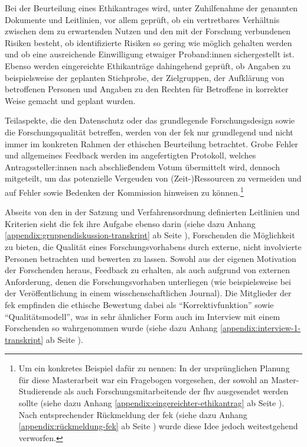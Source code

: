 \documentclass[a4paper,12pt,twoside]{scrreprt}
\begin{document}
Bei der Beurteilung eines Ethikantrages wird, unter Zuhilfenahme der genannten Dokumente und Leitlinien, vor allem geprüft, ob ein vertretbares Verhältnis zwischen dem zu erwartenden Nutzen und den mit der Forschung verbundenen Risiken besteht, ob identifizierte Risiken so gering wie möglich gehalten werden und ob eine ausreichende Einwilligung etwaiger Proband:innen sichergestellt ist. Ebenso werden eingereichte Ethikanträge dahingehend geprüft, ob Angaben zu beispielsweise der geplanten Stichprobe, der Zielgruppen, der Aufklärung von betroffenen Personen und Angaben zu den Rechten für Betroffene in korrekter Weise gemacht und geplant wurden. \cite[1\psq]{forschungsethik-kommission_der_fachhochschule_vorarlberg_verfahrensordnung_2020}

Teilaspekte, die den Datenschutz oder das grundlegende Forschungsdesign sowie die Forschungsqualität betreffen, werden von der \ac{fek} nur grundlegend und nicht immer im konkreten Rahmen der ethischen Beurteilung betrachtet. Grobe Fehler und allgemeines Feedback werden im angefertigten Protokoll, welches Antragssteller:innen nach abschließendem Votum übermittelt wird, dennoch mitgeteilt, um das potenzielle Vergeuden von (Zeit-)Ressourcen zu vermeiden und auf Fehler sowie Bedenken der Kommission hinweisen zu können.\footnote{Um ein konkretes Beispiel dafür zu nennen: In der ursprünglichen Planung für diese Masterarbeit war ein Fragebogen vorgesehen, der sowohl an Master-Studierende als auch Forschungsmitarbeitende der \ac{fhv} ausgesendet werden sollte (siehe dazu Anhang \ref{appendix:eingereichter-ethikantrag} ab Seite \pageref{appendix:eingereichter-ethikantrag}). Nach entsprechender Rückmeldung der \ac{fek} (siehe dazu Anhang \ref{appendix:rückmeldung-fek} ab Seite \pageref{appendix:rückmeldung-fek}) wurde diese Idee jedoch weitestgehend verworfen.} \cite[1\psq]{forschungsethik-kommission_der_fachhochschule_vorarlberg_verfahrensordnung_2020}

\medskip

Abseits von den in der Satzung und Verfahrensordnung definierten Leitlinien und Kriterien sieht die \ac{fek} ihre Aufgabe ebenso darin (siehe dazu Anhang \ref{appendix:gruppendiskussion-transkript} ab Seite \pageref{appendix:gruppendiskussion-transkript}), Forschenden die Möglichkeit zu bieten, die Qualität eines Forschungsvorhabens durch externe, nicht involvierte Personen betrachten und bewerten zu lassen. Sowohl aus der eigenen Motivation der Forschenden heraus, Feedback zu erhalten, als auch aufgrund von externen Anforderung, denen die Forschungsvorhaben unterliegen (wie beispielsweise bei der Veröffentlichung in einem wisschenschaftlichen Journal). Die Mitglieder der \ac{fek} empfinden die ethische Bewertung dabei als \enquote{Korrektivfunktion} sowie \enquote{Qualitätsmodell}, was in sehr ähnlicher Form auch im Interview mit einem Forschenden so wahrgenommen wurde (siehe dazu Anhang \ref{appendix:interview-1-transkript} ab Seite \pageref{appendix:interview-1-transkript}).
\end{document}
